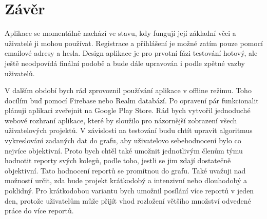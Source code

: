 \chapter{Závěr}

Aplikace se momentálně nachází ve stavu, kdy fungují její základní věci a uživatelé ji mohou používat. Registrace a přihlášení je možné zatím pouze pomocí emailové adresy a hesla. Design aplikace je pro prvotní fázi testování hotový, ale ještě neodpovídá finální podobě a bude dále upravován i podle zpětné vazby uživatelů. 

V dalším období bych rád zprovoznil používání aplikace v offline režimu. Toho docílím buď pomocí Firebase nebo Realm databází. Po opravení pár funkcionalit plánuji aplikaci zveřejnit na Google Play Store. Rád bych vytvořil jednoduché webové rozhraní aplikace, které by sloužilo pro názornější zobrazení všech uživatelových projektů. V závislosti na testování budu chtít upravit algoritmus vykreslování zadaných dat do grafu, aby uživatelovo sebehodnocení bylo co nejvíce objektivní. Proto bych chtěl také umožnit jednotlivým členům týmu hodnotit reporty svých kolegů, podle toho, jestli se jim zdají dostatečně objektivní. Tato hodnocení reportů se promítnou do grafu. Také uvažuji nad možností určit, zda bude projekt krátkodobý a intenzivní nebo dlouhodobý a poklidný. Pro krátkodobou variantu bych umožnil posílání více reportů v jeden den, protože uživatelům může přijít vhod rozložení většího množství odvedené práce do více reportů.  

